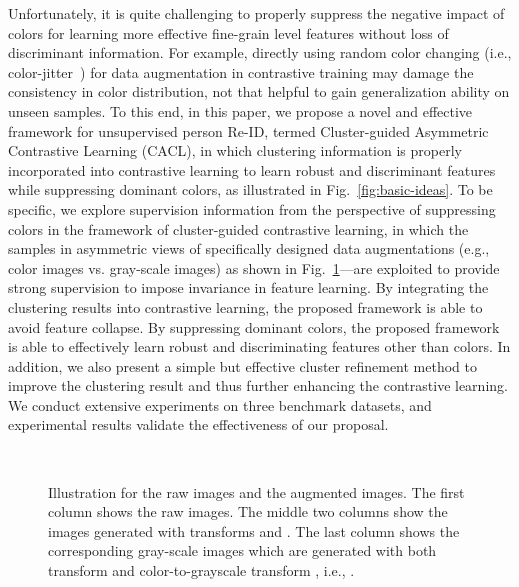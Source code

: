 \documentclass[journal]{IEEEtran}
\def\ie{i.e.}
\def\eg{e.g.}
\begin{document}
Unfortunately, it is quite challenging to properly suppress the negative impact of colors for learning more effective fine-grain level features without loss of discriminant information. For example, directly using random color changing (\ie, color-jitter~\cite{chen:cvpr2021}) for data augmentation in contrastive training may damage the consistency in color distribution, not that helpful to gain generalization ability on unseen samples.  To this end, in this paper, we propose a novel and effective framework for unsupervised person Re-ID, termed Cluster-guided Asymmetric Contrastive Learning (CACL), in which clustering information is properly incorporated into contrastive learning to learn robust and discriminant features while suppressing dominant colors, as illustrated in Fig.~\ref{fig:basic-ideas}. 
To be specific, we explore supervision information from the perspective of suppressing colors in the framework of cluster-guided contrastive learning, in which the samples in asymmetric views of specifically designed data augmentations (\eg, color images vs. gray-scale images) as shown in Fig.~\ref{fig:aug}---are exploited to provide strong supervision to impose invariance in feature learning. 
By integrating the clustering results into contrastive learning, the proposed framework is able to avoid feature collapse.
By suppressing dominant colors, the proposed framework is able to effectively learn robust and discriminating features other than colors. 
In addition, we also present a simple but effective cluster refinement method to improve the clustering result and thus further enhancing the contrastive learning.
We conduct extensive experiments on three benchmark datasets, and experimental results validate the effectiveness of our proposal.





\begin{figure}
\begin{center}
\footnotesize
{} ~~~~~~~~
~~~~~~~~
~~~~~~~~

\end{center}
\caption{Illustration for the raw images and the augmented images. The first column shows the raw images. The middle two columns show the images generated with transforms  and . The last column shows the corresponding gray-scale images which  are generated with both transform  and color-to-grayscale transform , \ie, . }
\label{fig:aug}
\end{figure}
\end{document}
